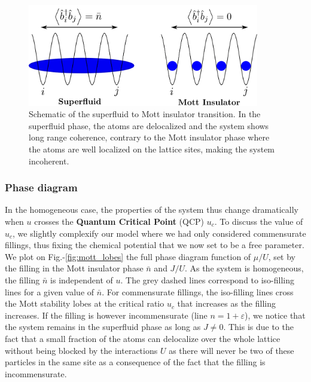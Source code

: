 \begin{figure}
    \centering
    \includegraphics[width=0.9\textwidth]{Fig/Chapter2/schema_superfluid_mott.png}
    \caption[Schematic of the superfluid to Mott insulator transition]{Schematic of the superfluid to Mott insulator transition. In the superfluid phase, the atoms are delocalized and the system shows long range coherence, contrary to the Mott insulator phase where the atoms are well localized on the lattice sites, making the system incoherent.}
    \label{fig:my_label}
\end{figure}

\subsubsection{Phase diagram}

In the homogeneous case, the properties of the system thus change dramatically when $u$ crosses the \textbf{Quantum Critical Point} (QCP) $u_c$. To discuss the value of $u_c$, we slightly complexify our model where we had only considered commensurate fillings, thus fixing the chemical potential that we now set to be a free parameter. We plot on Fig.-\ref{fig:mott_lobes} the full phase diagram function of $\mu/U$, set by the filling in the Mott insulator phase $\bar{n}$ and $J/U$. As the system is homogeneous, the filling $\bar{n}$ is independent of $u$. The grey dashed lines correspond to iso-filling lines for a given value of $\bar{n}$. For commensurate fillings, the iso-filling lines cross the Mott stability lobes at the critical ratio $u_c$ that increases as the filling increases. If the filling is however incommensurate (line $n=1+\varepsilon$), we notice that the system remains in the superfluid phase as long as $J \neq 0$. This is due to the fact that a small fraction of the atoms can delocalize over the whole lattice without being blocked by the interactions $U$ as there will never be two of these particles in the same site as a consequence of the fact that the filling is incommensurate.

